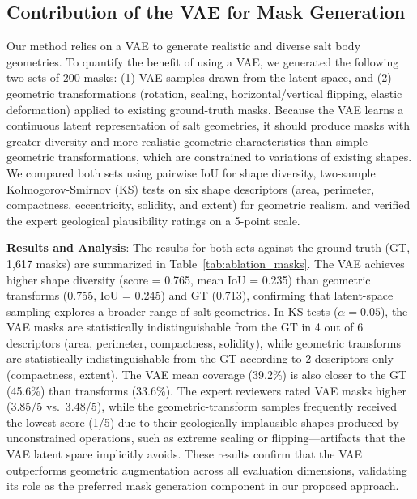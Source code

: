 \documentclass{ieeeaccess}
\begin{document}
\subsection{Contribution of the VAE for Mask Generation}

Our method relies on a VAE to generate realistic and diverse salt body geometries. To quantify the benefit of using a VAE, we generated the following two sets of 200 masks: (1) VAE samples drawn from the latent space, and (2) geometric transformations (rotation, scaling, horizontal/vertical flipping, elastic deformation) applied to existing ground-truth masks. Because the VAE learns a continuous latent representation of salt geometries, it should produce masks with greater diversity and more realistic geometric characteristics than simple geometric transformations, which are constrained to variations of existing shapes. We compared both sets using pairwise IoU for shape diversity, two-sample Kolmogorov-Smirnov (KS) tests on six shape descriptors (area, perimeter, compactness, eccentricity, solidity, and extent) for geometric realism, and verified the expert geological plausibility ratings on a 5-point scale.

\textbf{Results and Analysis}: The results for both sets against the ground truth (GT, 1,617 masks) are summarized in Table~\ref{tab:ablation_masks}. The VAE achieves higher shape diversity (score = 0.765, mean IoU = 0.235) than geometric transforms (0.755, IoU = 0.245) and GT (0.713), confirming that latent-space sampling explores a broader range of salt geometries. In KS tests ($\alpha = 0.05$), the VAE masks are statistically indistinguishable from the GT in 4 out of 6 descriptors (area, perimeter, compactness, solidity), while geometric transforms are statistically indistinguishable from the GT according to 2 descriptors only (compactness, extent). The VAE mean coverage (39.2\%) is also closer to the GT (45.6\%) than transforms (33.6\%). The expert reviewers rated VAE masks higher (3.85/5 vs.\ 3.48/5), while the geometric-transform samples frequently received the lowest score (1/5) due to their geologically implausible shapes produced by unconstrained operations, such as extreme scaling or flipping---artifacts that the VAE latent space implicitly avoids. These results confirm that the VAE outperforms geometric augmentation across all evaluation dimensions, validating its role as the preferred mask generation component in our proposed approach.
\end{document}
